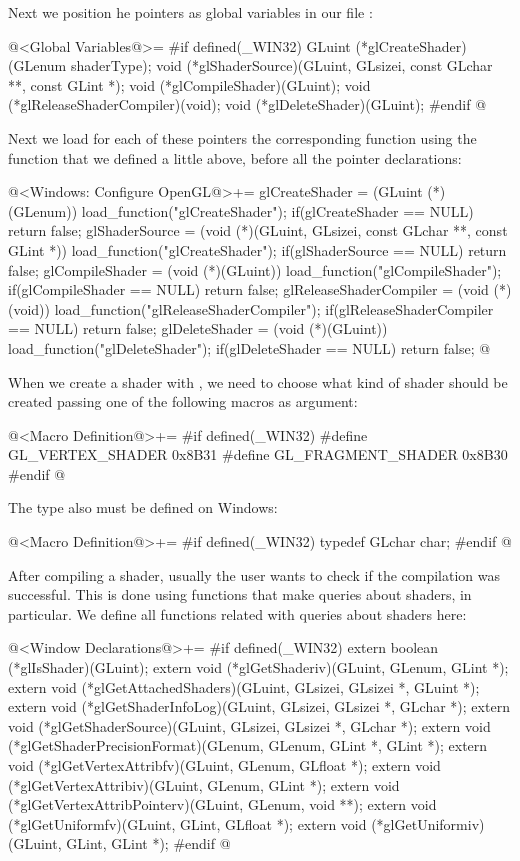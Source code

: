 Next we position he pointers as global variables in our
file :

\iniciocodigo
@<Global Variables@>=
#if defined(_WIN32)
GLuint (*glCreateShader)(GLenum shaderType);
void (*glShaderSource)(GLuint, GLsizei, const GLchar **, const GLint *);
void (*glCompileShader)(GLuint);
void (*glReleaseShaderCompiler)(void);
void (*glDeleteShader)(GLuint);
#endif
@
\fimcodigo

Next we load for each of these pointers the corresponding function
using the function that we defined a little above, before all the
pointer declarations:

\iniciocodigo
@<Windows: Configure OpenGL@>+=
glCreateShader = (GLuint (*)(GLenum)) load_function("glCreateShader");
if(glCreateShader == NULL)
  return false;
glShaderSource = (void (*)(GLuint, GLsizei, const GLchar **, const GLint *))
                    load_function("glCreateShader");
if(glShaderSource == NULL)
  return false;
glCompileShader = (void (*)(GLuint)) load_function("glCompileShader");
if(glCompileShader == NULL)
  return false;
glReleaseShaderCompiler = (void (*)(void))
                             load_function("glReleaseShaderCompiler");
if(glReleaseShaderCompiler == NULL)
  return false;
glDeleteShader = (void (*)(GLuint)) load_function("glDeleteShader");
if(glDeleteShader == NULL)
  return false;
@
\fimcodigo

When we create a shader with , we need to
choose what kind of shader should be created passing one of the
following macros as argument:

\iniciocodigo
@<Macro Definition@>+=
#if defined(_WIN32)
#define GL_VERTEX_SHADER          0x8B31
#define GL_FRAGMENT_SHADER        0x8B30
#endif
@
\fimcodigo

The type  also must be defined on Windows:

\iniciocodigo
@<Macro Definition@>+=
#if defined(_WIN32)
typedef GLchar char;
#endif
@
\fimcodigo


After compiling a shader, usually the user wants to check if the
compilation was successful. This is done using functions that make
queries about shaders,  in particular. We
define all functions related with queries about shaders here:

\iniciocodigo
@<Window Declarations@>+=
#if defined(_WIN32)
extern boolean (*glIsShader)(GLuint);
extern void (*glGetShaderiv)(GLuint, GLenum, GLint *);
extern void (*glGetAttachedShaders)(GLuint, GLsizei, GLsizei *, GLuint *);
extern void (*glGetShaderInfoLog)(GLuint, GLsizei, GLsizei *, GLchar *);
extern void (*glGetShaderSource)(GLuint, GLsizei, GLsizei *, GLchar *);
extern void (*glGetShaderPrecisionFormat)(GLenum, GLenum, GLint *, GLint *);
extern void (*glGetVertexAttribfv)(GLuint, GLenum, GLfloat *);
extern void (*glGetVertexAttribiv)(GLuint, GLenum, GLint *);
extern void (*glGetVertexAttribPointerv)(GLuint, GLenum, void **);
extern void (*glGetUniformfv)(GLuint, GLint, GLfloat *);
extern void (*glGetUniformiv)(GLuint, GLint, GLint *);
#endif
@
\fimcodigo

